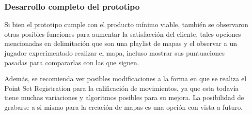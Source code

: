 \subsubsection{Desarrollo completo del prototipo}

Si bien el prototipo cumple con el producto mínimo viable, también se observaron otras posibles funciones para aumentar la satisfacción del cliente, tales opciones mencionadas en delimitación que son una playlist de mapas y el observar a un jugador experimentado realizar el mapa, incluso mostrar sus puntuaciones pasadas para compararlas con las que siguen.

Además, se recomienda ver posibles modificaciones a la forma en que se realiza el Point Set Registration para la calificación de movimientos, ya que esta todavía tiene muchas variaciones y algoritmos posibles para su mejora. La posibilidad de grabarse a si mismo para la creación de mapas es una opción con vista a futuro.









